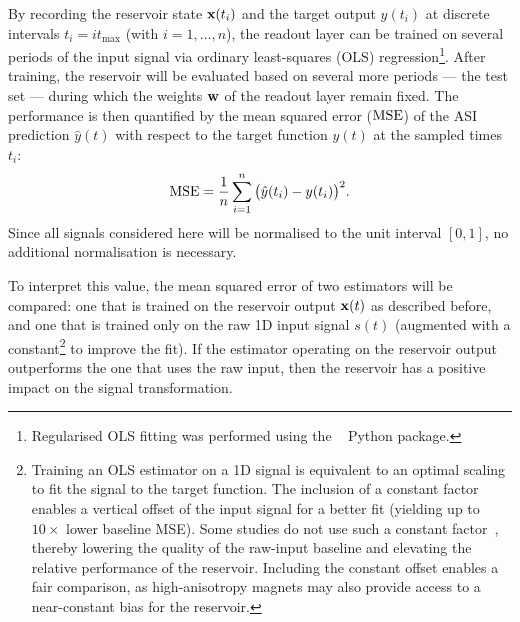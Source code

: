By recording the reservoir state $\boldsymbol{\mathbf{x}}(t_i)$ and the target output $y(t_i)$ at discrete intervals $t_i = i t_\mathrm{max}$ (with $i = 1,\dots,n$), the readout layer can be trained on several periods of the input signal via ordinary least-squares (OLS) regression\footnote{
	Regularised OLS fitting was performed using the ~\cite{statsmodels} Python package.
}.
After training, the reservoir will be evaluated based on several more periods --- the test set --- during which the weights $\boldsymbol{\mathbf{w}}$ of the readout layer remain fixed. %
The performance is then quantified by the mean squared error ($\mathrm{MSE}$) of the ASI prediction $\hat{y}(t)$ with respect to the target function $y(t)$ at the sampled times $t_i$:
\begin{equation}
	\label{eq:3:MSE}
	\mathrm{MSE} = \frac{1}{n} \sum_{i=1}^n \big(\hat{y}(t_i) - y(t_i)\big)^2 \mathrm{.}
\end{equation}
Since all signals considered here will be normalised to the unit interval $[0,1]$, no additional normalisation is necessary. \par
To interpret this value, the mean squared error of two estimators will be compared: one that is trained on the reservoir output $\boldsymbol{\mathbf{x}}(t)$ as described before, and one that is trained only on the raw 1D input signal $s(t)$ (augmented with a constant\footnote{
	Training an OLS estimator on a 1D signal is equivalent to an optimal scaling to fit the signal to the target function.
	The inclusion of a constant factor enables a vertical offset of the input signal for a better fit (yielding up to $10 \times$ lower baseline MSE).
	Some studies do not use such a constant factor~\cite{gartside2022reconfigurable}, thereby lowering the quality of the raw-input baseline and elevating the relative performance of the reservoir.
	Including the constant offset enables a fair comparison, as high-anisotropy magnets may also provide access to a near-constant bias for the reservoir.
} to improve the fit).
If the estimator operating on the reservoir output outperforms the one that uses the raw input, then the reservoir has a positive impact on the signal transformation.

